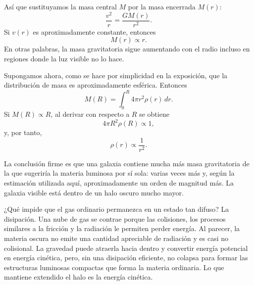 Así que sustituyamos la masa central \(M\) por la masa encerrada \(M(r)\):
\begin{equation}
\frac{v^2}{r}=\frac{G M(r)}{r^2}.
\end{equation}
Si \(v(r)\) es aproximadamente constante, entonces
\begin{equation}
M(r)\propto r.
\end{equation}
En otras palabras, la masa gravitatoria sigue aumentando con el radio incluso en regiones donde la luz visible no lo hace.

Supongamos ahora, como se hace por simplicidad en la exposición, que la distribución de masa es aproximadamente esférica. Entonces
\begin{equation}
M(R)=\int_0^R 4\pi r^2\rho(r)\,dr.
\end{equation}
Si \(M(R)\propto R\), al derivar con respecto a \(R\) se obtiene
\begin{equation}
4\pi R^2\rho(R)\propto 1,
\end{equation}
y, por tanto,
\begin{equation}
\rho(r)\propto \frac{1}{r^2}.
\end{equation}

\begin{classroomqa}
\end{classroomqa}

La conclusión firme es que una galaxia contiene mucha más masa gravitatoria de la que sugeriría la materia luminosa por sí sola: varias veces más y, según la estimación utilizada aquí, aproximadamente un orden de magnitud más. La galaxia visible está dentro de un halo oscuro mucho mayor.

¿Qué impide que el gas ordinario permanezca en un estado tan difuso? La disipación. Una nube de gas se contrae porque las colisiones, los procesos similares a la fricción y la radiación le permiten perder energía. Al parecer, la materia oscura no emite una cantidad apreciable de radiación y es casi no colisional. La gravedad puede atraerla hacia dentro y convertir energía potencial en energía cinética, pero, sin una disipación eficiente, no colapsa para formar las estructuras luminosas compactas que forma la materia ordinaria. Lo que mantiene extendido el halo es la energía cinética.

